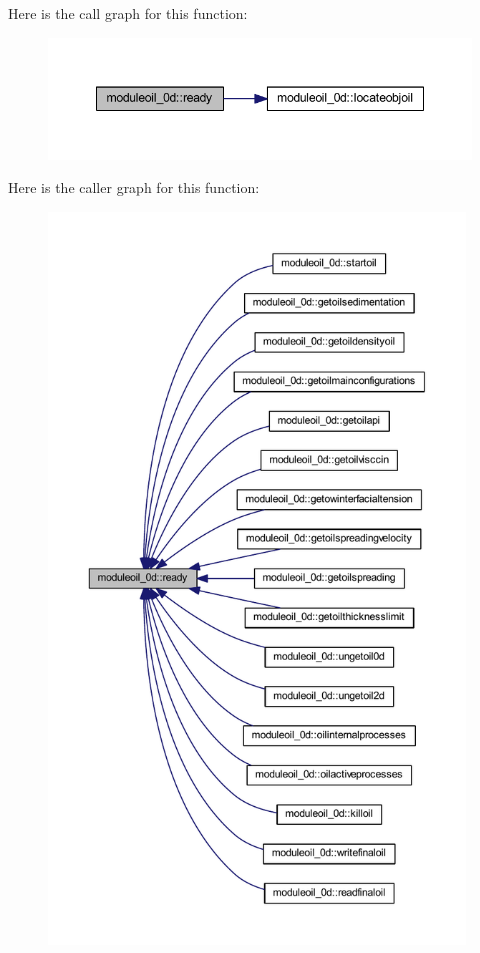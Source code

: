 Here is the call graph for this function\+:\nopagebreak
\begin{figure}[H]
\begin{center}
\leavevmode
\includegraphics[width=348pt]{namespacemoduleoil__0d_a5cfb3f6c158c2f89ed12f50f11b66786_cgraph}
\end{center}
\end{figure}
Here is the caller graph for this function\+:\nopagebreak
\begin{figure}[H]
\begin{center}
\leavevmode
\includegraphics[height=550pt]{namespacemoduleoil__0d_a5cfb3f6c158c2f89ed12f50f11b66786_icgraph}
\end{center}
\end{figure}
\mbox{\label{namespacemoduleoil__0d_a45b30490a7ce5da933ae0f54cfea07d9}} 
